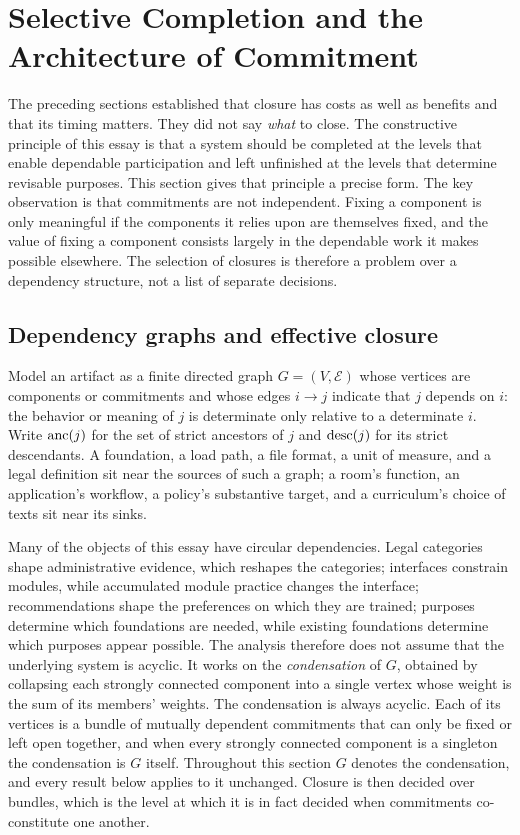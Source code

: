 \section{Selective Completion and the Architecture of Commitment}\label{sec:selective}

The preceding sections established that closure has costs as well as benefits and that its timing matters. They did not say \emph{what} to close. The constructive principle of this essay is that a system should be completed at the levels that enable dependable participation and left unfinished at the levels that determine revisable purposes. This section gives that principle a precise form. The key observation is that commitments are not independent. Fixing a component is only meaningful if the components it relies upon are themselves fixed, and the value of fixing a component consists largely in the dependable work it makes possible elsewhere. The selection of closures is therefore a problem over a dependency structure, not a list of separate decisions.

\subsection{Dependency graphs and effective closure}

Model an artifact as a finite directed graph $G=(V,\mathcal{E})$ whose vertices are components or commitments and whose edges $i\to j$ indicate that $j$ depends on $i$: the behavior or meaning of $j$ is determinate only relative to a determinate $i$. Write $\operatorname{anc}(j)$ for the set of strict ancestors of $j$ and $\operatorname{desc}(j)$ for its strict descendants. A foundation, a load path, a file format, a unit of measure, and a legal definition sit near the sources of such a graph; a room's function, an application's workflow, a policy's substantive target, and a curriculum's choice of texts sit near its sinks.

Many of the objects of this essay have circular dependencies. Legal categories shape administrative evidence, which reshapes the categories; interfaces constrain modules, while accumulated module practice changes the interface; recommendations shape the preferences on which they are trained; purposes determine which foundations are needed, while existing foundations determine which purposes appear possible. The analysis therefore does not assume that the underlying system is acyclic. It works on the \emph{condensation} of $G$, obtained by collapsing each strongly connected component into a single vertex whose weight is the sum of its members' weights. The condensation is always acyclic. Each of its vertices is a bundle of mutually dependent commitments that can only be fixed or left open together, and when every strongly connected component is a singleton the condensation is $G$ itself. Throughout this section $G$ denotes the condensation, and every result below applies to it unchanged. Closure is then decided over bundles, which is the level at which it is in fact decided when commitments co-constitute one another.

